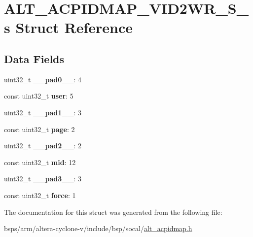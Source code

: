 \hypertarget{structALT__ACPIDMAP__VID2WR__S__s}{}\section{A\+L\+T\+\_\+\+A\+C\+P\+I\+D\+M\+A\+P\+\_\+\+V\+I\+D2\+W\+R\+\_\+\+S\+\_\+s Struct Reference}
\label{structALT__ACPIDMAP__VID2WR__S__s}
\subsection*{Data Fields}
\begin{DoxyCompactItemize}
\item 
\mbox{\label{structALT__ACPIDMAP__VID2WR__S__s_a5d6fdc8aa2ea2707acff4709431930d5}} 
uint32\+\_\+t {\bfseries \+\_\+\+\_\+pad0\+\_\+\+\_\+}\+: 4
\item 
\mbox{\label{structALT__ACPIDMAP__VID2WR__S__s_a7e1726303a702e7c45b18d8edbd02cdb}} 
const uint32\+\_\+t {\bfseries user}\+: 5
\item 
\mbox{\label{structALT__ACPIDMAP__VID2WR__S__s_abd76c643634bb731044a33378126381d}} 
uint32\+\_\+t {\bfseries \+\_\+\+\_\+pad1\+\_\+\+\_\+}\+: 3
\item 
\mbox{\label{structALT__ACPIDMAP__VID2WR__S__s_a2b60e1b173eb0c6eb7fa82450ea9c4d9}} 
const uint32\+\_\+t {\bfseries page}\+: 2
\item 
\mbox{\label{structALT__ACPIDMAP__VID2WR__S__s_aa8300a09a41c75bf055be4a34c803bbf}} 
uint32\+\_\+t {\bfseries \+\_\+\+\_\+pad2\+\_\+\+\_\+}\+: 2
\item 
\mbox{\label{structALT__ACPIDMAP__VID2WR__S__s_ad91cb47f14082e39770168668273b36d}} 
const uint32\+\_\+t {\bfseries mid}\+: 12
\item 
\mbox{\label{structALT__ACPIDMAP__VID2WR__S__s_afb4246a1494cb5c3a97d9cbbacc813a2}} 
uint32\+\_\+t {\bfseries \+\_\+\+\_\+pad3\+\_\+\+\_\+}\+: 3
\item 
\mbox{\label{structALT__ACPIDMAP__VID2WR__S__s_aaba5ab8ef74ec2598f8ac78ed3547741}} 
const uint32\+\_\+t {\bfseries force}\+: 1
\end{DoxyCompactItemize}


The documentation for this struct was generated from the following file\+:\begin{DoxyCompactItemize}
\item 
bsps/arm/altera-\/cyclone-\/v/include/bsp/socal/\mbox{\hyperlink{alt__acpidmap_8h}{alt\+\_\+acpidmap.\+h}}\end{DoxyCompactItemize}
